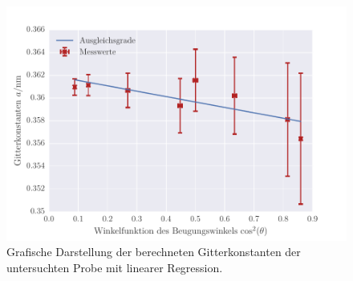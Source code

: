 \begin{figure}[!h]
 \centering
 \includegraphics[scale=0.8]{../Grafiken/Gitterkonstante_Probe.pdf}
 \caption{Grafische Darstellung der berechneten Gitterkonstanten der untersuchten Probe mit linearer Regression.\label{fig:gitterkonstante_probe}}
 \end{figure} 